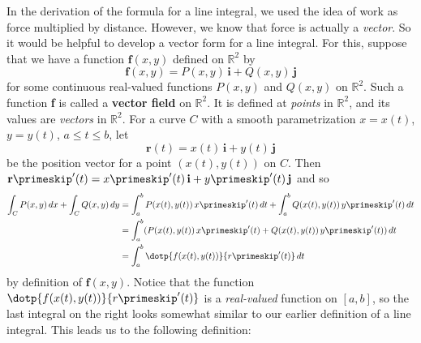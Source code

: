 In the derivation of the formula for a line integral, we used the idea of work as force multiplied by distance. However, we know that force is actually a \emph{vector}. So it would be helpful to develop a vector form for a line integral. For this, suppose that we have a function $\textbf{f}(x,y)$ defined on $\mathbb{R}^2$ by
\[\textbf{f}(x,y) = P(x,y)\,\textbf{i} + Q(x,y)\,\textbf{j}\]
for some continuous real-valued functions $P(x,y)$ and $Q(x,y)$ on $\mathbb{R}^2$. Such a function \textbf{f} is called a \textbf{vector field} on $\mathbb{R}^2$. It is defined at \emph{points} in $\mathbb{R}^2$, and its values are \emph{vectors} in $\mathbb{R}^2$. For a curve $C$ with a smooth parametrization $x=x(t)$, $y=y(t)$, $a \le t \le b$, let
\[\textbf{r}(t) = x(t)\,\textbf{i} + y(t)\,\textbf{j}\]
be the position vector for a point $(x(t),y(t))$ on $C$. Then $\textbf{r}\primeskip'(t) = x\primeskip'(t)\,\textbf{i} + y\primeskip'(t)\,\textbf{j}$ and so
\begin{align*}
 \int_C P(x,y)\,dx + \int_C Q(x,y)\,dy
 &= \int_a^b P(x(t),y(t)) \,x\primeskip'(t)\,dt + \int_a^b Q(x(t),y(t)) \,y\primeskip'(t)\,dt\\
  &= \int_a^b (P(x(t),y(t)) \,x\primeskip'(t) + Q(x(t),y(t)) \,y\primeskip'(t))\,dt\\
  &= \int_a^b \dotp{f(x(t),y(t))}{r\primeskip'(t)}\,dt
\end{align*}
by definition of $\textbf{f}(x,y)$. Notice that the function $\dotp{f(x(t),y(t))}{r\primeskip'(t)}$ is a \emph{real-valued} function on $[a,b]$, so the last integral on the right looks somewhat similar to our earlier definition of a line integral. This leads us to the following definition:


